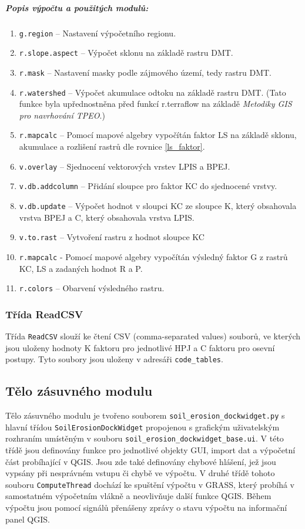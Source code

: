 \subparagraph{Popis výpočtu a použitých modulů:}
\begin{enumerate}
	\item \texttt{g.region} – Nastavení výpočetního regionu.
	\item \texttt{r.slope.aspect} – Výpočet sklonu na základě rastru DMT.
	\item \texttt{r.mask} – Nastavení masky podle zájmového území, tedy rastru DMT.
	\item \texttt{r.watershed} – Výpočet akumulace odtoku na základě rastru DMT. (Tato funkce byla upřednostněna před funkcí r.terraflow na základě \textit{Metodiky GIS pro navrhování TPEO}\cite{Dostal2014}.)
	\item \texttt{r.mapcalc} – Pomocí mapové algebry vypočítán faktor LS na základě sklonu, akumulace a rozlišení rastrů dle rovnice \ref{ls_faktor}. 
	\item \texttt{v.overlay} – Sjednocení vektorových vrstev LPIS a BPEJ.
	\item \texttt{v.db.addcolumn} – Přidání sloupce pro faktor KC do sjednocené vrstvy.
	\item \texttt{v.db.update} – Výpočet hodnot v sloupci KC ze sloupce K, který obsahovala vrstva BPEJ a C, který obsahovala vrstva LPIS.
	\item \texttt{v.to.rast} – Vytvoření rastru z hodnot sloupce KC
	\item \texttt{r.mapcalc} - Pomocí mapové algebry vypočítán výsledný faktor G z rastrů KC, LS a zadaných hodnot R a P.
	\item \texttt{r.colors} – Obarvení výsledného rastru.
\end{enumerate} 

\subsubsection{Třída ReadCSV}
Třída \texttt{ReadCSV} slouží ke čtení CSV (comma-separated values) souborů, ve kterých jsou uloženy hodnoty K faktoru pro jednotlivé HPJ a C faktoru pro osevní postupy. Tyto soubory jsou uloženy v adresáři \texttt{code\_tables}. 

\subsection{Tělo zásuvného modulu}
Tělo zásuvného modulu je tvořeno souborem \texttt{soil\_erosion\_dockwidget.py} s hlavní třídou \texttt{SoilErosionDockWidget} propojenou s grafickým uživatelským rozhraním umístěným v souboru \texttt{soil\_erosion\_dockwidget\_base.ui}. V této třídě jsou definovány funkce pro jednotlivé objekty GUI, import dat a výpočetní část probíhající v QGIS. Jsou zde také definovány chybové hlášení, jež jsou vypsány při nesprávném vstupu či chybě ve výpočtu. V druhé třídě tohoto souboru \texttt{ComputeThread} dochází ke spuštění výpočtu v GRASS, který probíhá v samostatném výpočetním vlákně a neovlivňuje další funkce QGIS. Během výpočtu jsou pomocí signálů přenášeny zprávy o stavu výpočtu na informační panel QGIS. 

